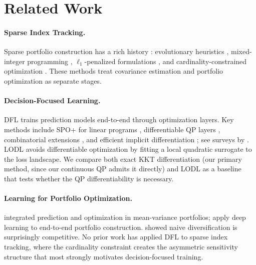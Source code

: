 \documentclass[letterpaper]{article}
\begin{document}
\section{Related Work}

\paragraph{Sparse Index Tracking.}
Sparse portfolio construction has a rich history \citep{kolm2014years}: evolutionary heuristics \citep{beasley2003evolutionary}, mixed-integer programming \citep{canakgoz2009mixed,bertsimas2022sparse}, $\ell_1$-penalized formulations \citep{benidis2018sparse,brodie2009sparse}, and cardinality-constrained optimization \citep{xu2016sparse}. These methods treat covariance estimation and portfolio optimization as separate stages.

\paragraph{Decision-Focused Learning.}
DFL trains prediction models end-to-end through optimization layers. Key methods include SPO+ for linear programs \citep{elmachtoub2022smart}, differentiable QP layers \citep{donti2017task,amos2017optnet,agrawal2019differentiable}, combinatorial extensions \citep{wilder2019melding,vlastelica2020differentiation,sahoo2023backpropagation}, and efficient implicit differentiation \citep{blondel2022efficient}; see surveys by \citet{kotary2021end,mandi2024decision}. LODL \citep{shah2022decision} avoids differentiable optimization by fitting a local quadratic surrogate to the loss landscape. We compare both exact KKT differentiation (our primary method, since our continuous QP admits it directly) and LODL as a baseline that tests whether the QP differentiability is necessary.

\paragraph{Learning for Portfolio Optimization.}
\citet{butler2023integrating} integrated prediction and optimization in mean-variance portfolios; \citet{zhang2021deep} apply deep learning to end-to-end portfolio construction. \citet{demiguel2009optimal} showed naive diversification is surprisingly competitive. No prior work has applied DFL to sparse index tracking, where the cardinality constraint creates the asymmetric sensitivity structure that most strongly motivates decision-focused training.
\end{document}
